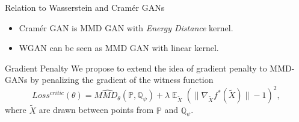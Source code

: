 \documentclass[xcolor={table}]{beamer}
\DeclareMathOperator*{\E}{\mathbb{E}}
\newcommand{\PP}{\mathbb P}
\newcommand{\QQ}{\mathbb Q}
\newcommand{\ZZ}{\mathbb Z}
\begin{document}
\begin{frame}{}
\begin{columns}[T, totalwidth=\textwidth]
\begin{column}{.32\textwidth}
\begin{block}{Relation to Wasserstein and Cram\'er GANs}
\begin{itemize}
{\begin{align*}
            f^*(t) &= \E_{\PP}k(X, t) - \E_{\QQ}k(Y, t),
          \end{align*}
          Where $k$ is a kernel function. MMD GANs \citep{mmd-gan}, however, 
          optimize the representation in the composite kernel 
          \[ k_{\theta}(x, y) = k_{base}(h_{\theta}(x), h_{\theta}(y)). \]
        }
        \item Cram\'er GAN is MMD GAN with \emph{Energy Distance} kernel.
        \item WGAN can be seen as MMD GAN with linear kernel.
      \end{itemize}
    \end{block}
    \vspace*{-1.2cm}
    \begin{block}{Gradient Penalty}
      We propose to extend the idea of gradient penalty to MMD-GANs by penalizing the
      gradient of the witness function 
      \[ Loss^{critic}(\theta) = \widehat{MMD_{\theta}}(\PP, \QQ_{\psi}) + \lambda\E_{\tilde{X}}\left(\|\nabla_{\tilde{X}} f^*(\tilde{X})\| - 1\right)^2, \]
      where $\tilde{X}$ are drawn between points from $\PP$ and $\QQ_{\psi}$. %
    \end{block}
  \end{column}


\end{columns}
\end{frame}
\end{document}
